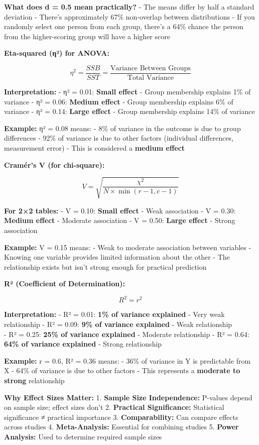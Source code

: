 \documentclass[11pt]{article}
\begin{document}
\textbf{What does d = 0.5 mean practically?} - The means differ by half
a standard deviation - There's approximately 67\% non-overlap between
distributions - If you randomly select one person from each group,
there's a 64\% chance the person from the higher-scoring group will have
a higher score

\textbf{Eta-squared (η²) for ANOVA:}

\[\eta^2 = \frac{SSB}{SST} = \frac{\text{Variance Between Groups}}{\text{Total Variance}}\]

\textbf{Interpretation:} - η² = 0.01: \textbf{Small effect} - Group
membership explains 1\% of variance - η² = 0.06: \textbf{Medium effect}
- Group membership explains 6\% of variance - η² = 0.14: \textbf{Large
effect} - Group membership explains 14\% of variance

\textbf{Example:} η² = 0.08 means: - 8\% of variance in the outcome is
due to group differences - 92\% of variance is due to other factors
(individual differences, measurement error) - This is considered a
\textbf{medium effect}

\textbf{Cramér's V (for chi-square):}

\[V = \sqrt{\frac{\chi^2}{N \times \min(r-1, c-1)}}\]

\textbf{For 2×2 tables:} - V = 0.10: \textbf{Small effect} - Weak
association - V = 0.30: \textbf{Medium effect} - Moderate association -
V = 0.50: \textbf{Large effect} - Strong association

\textbf{Example:} V = 0.15 means: - Weak to moderate association between
variables - Knowing one variable provides limited information about the
other - The relationship exists but isn't strong enough for practical
prediction

\textbf{R² (Coefficient of Determination):}

\[R^2 = r^2\]

\textbf{Interpretation:} - R² = 0.01: \textbf{1\% of variance explained}
- Very weak relationship - R² = 0.09: \textbf{9\% of variance explained}
- Weak relationship\\
- R² = 0.25: \textbf{25\% of variance explained} - Moderate relationship
- R² = 0.64: \textbf{64\% of variance explained} - Strong relationship

\textbf{Example:} r = 0.6, R² = 0.36 means: - 36\% of variance in Y is
predictable from X - 64\% of variance is due to other factors - This
represents a \textbf{moderate to strong} relationship

\textbf{Why Effect Sizes Matter:} 1. \textbf{Sample Size Independence:}
P-values depend on sample size; effect sizes don't 2. \textbf{Practical
Significance:} Statistical significance ≠ practical importance 3.
\textbf{Comparability:} Can compare effects across studies 4.
\textbf{Meta-Analysis:} Essential for combining studies 5. \textbf{Power
Analysis:} Used to determine required sample sizes
\end{document}
